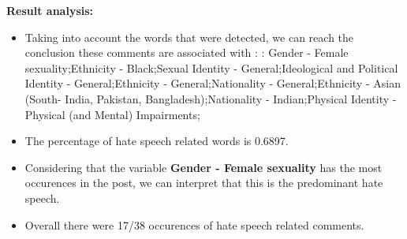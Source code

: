 \documentclass[11pt]{article}
\begin{document}
\textbf{\Large Result analysis:}

\begin{itemize}\item Taking into account the words that were detected, we can reach the conclusion these comments are associated with : : Gender - Female sexuality;Ethnicity - Black;Sexual Identity - General;Ideological and Political Identity - General;Ethnicity - General;Nationality - General;Ethnicity - Asian (South- India, Pakistan, Bangladesh);Nationality - Indian;Physical Identity - Physical (and Mental) Impairments;%

\item The percentage of hate speech related words is 0.6897.

\item Considering that the variable \textbf{Gender - Female sexuality} has the most occurences in the post, we can interpret that this is the predominant hate speech.

\item Overall there were 17/38 occurences of hate speech related comments.\end{itemize}
\end{document}
